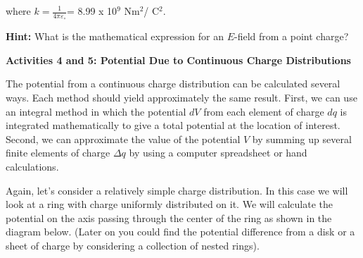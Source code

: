 where \( k=\frac{1}{4\pi \varepsilon _{\circ }} \)= 8.99 x 10\( ^{9} \)
Nm\( ^{2} \)/ C\( ^{2} \).

\vspace{0.3cm}
{\centering {} \par}
\vspace{0.3cm}

\textbf{Hint:} What is the mathematical expression for an $E$-field
from a point charge?
\vspace{30mm}

\textbf{Activities 4 and 5: Potential Due to Continuous Charge Distributions}

The potential from a continuous charge distribution can be calculated
several ways. Each method should yield approximately the same result.
First, we can use an integral method in which the potential $dV$ from
each element of charge $dq$ is integrated mathematically to give a total
potential at the location of interest. Second, we can approximate
the value of the potential $V$ by summing up several finite elements
of charge \( \Delta q \) by using a computer spreadsheet or hand
calculations.

Again, let's consider a relatively simple charge distribution. In
this case we will look at a ring with charge uniformly distributed
on it. We will calculate the potential on the axis passing through
the center of the ring as shown in the diagram below. (Later on you
could find the potential difference from a disk or a sheet of charge
by considering a collection of nested rings).

